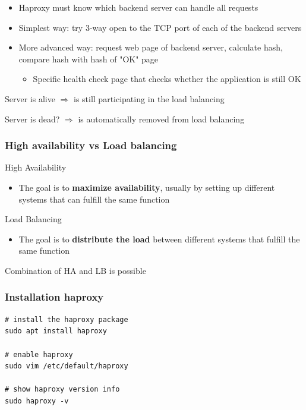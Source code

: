 \documentclass{article}
\begin{document}
\begin{itemize}
    \item Haproxy must know which backend server can handle all requests
    \item Simplest way: try 3-way open to the TCP port of each of the backend servers
    \item More advanced way: request web page of backend server, calculate hash, compare hash with hash of "OK" page
    \begin{itemize}
        \item Specific health check page that checks whether the application is still OK
    \end{itemize}
\end{itemize}

Server is alive $\Rightarrow$ is still participating in the load balancing

Server is dead? $\Rightarrow$ is automatically removed from load balancing

\subsubsection{High availability vs Load balancing}

High Availability

\begin{itemize}
    \item The goal is to \textbf{maximize availability}, usually by setting up different systems that can fulfill the same function
\end{itemize}

Load Balancing

\begin{itemize}
    \item The goal is to \textbf{distribute the load} between different systems that fulfill the same function
\end{itemize}

Combination of HA and LB is possible

\subsubsection{Installation haproxy}

\begin{verbatim}
# install the haproxy package
sudo apt install haproxy

# enable haproxy
sudo vim /etc/default/haproxy

# show haproxy version info
sudo haproxy -v
\end{verbatim}
\end{document}
